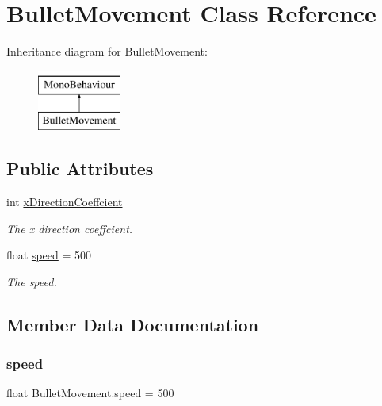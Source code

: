 \hypertarget{class_bullet_movement}{}\section{Bullet\+Movement Class Reference}
\label{class_bullet_movement}
Inheritance diagram for Bullet\+Movement\+:\begin{figure}[H]
\begin{center}
\leavevmode
\includegraphics[height=2.000000cm]{class_bullet_movement}
\end{center}
\end{figure}
\subsection*{Public Attributes}
\begin{DoxyCompactItemize}
\item 
int \mbox{\hyperlink{class_bullet_movement_a87f4f6ec7b16819ee058cfc9121660e0}{x\+Direction\+Coeffcient}}
\begin{DoxyCompactList}\small\item\em The x direction coeffcient. \end{DoxyCompactList}\item 
float \mbox{\hyperlink{class_bullet_movement_aeb1ed7a8c4bd668bb3039562e46fa63b}{speed}} = 500
\begin{DoxyCompactList}\small\item\em The speed. \end{DoxyCompactList}\end{DoxyCompactItemize}


\subsection{Member Data Documentation}
\mbox{\label{class_bullet_movement_aeb1ed7a8c4bd668bb3039562e46fa63b}} 
\subsubsection{\texorpdfstring{speed}{speed}}
{\footnotesize\ttfamily float Bullet\+Movement.\+speed = 500}



